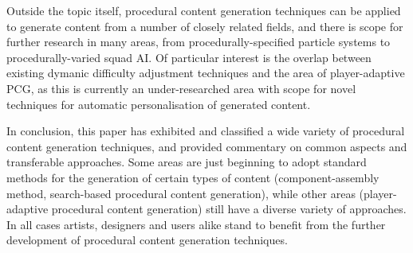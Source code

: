 \documentclass{acm_proc_article-sp}
\begin{document}
Outside the topic itself, procedural content generation techniques can be applied to generate content from a number of closely related fields, and there is scope for further research in many areas, from procedurally-specified particle systems to procedurally-varied squad AI. Of particular interest is the overlap between existing dymanic difficulty adjustment techniques and the area of player-adaptive PCG, as this is currently an under-researched area with scope for novel techniques for automatic personalisation of generated content.

In conclusion, this paper has exhibited and classified a wide variety of procedural content generation techniques, and provided commentary on common aspects and transferable approaches. Some areas are just beginning to adopt standard methods for the generation of certain types of content (component-assembly method, search-based procedural content generation), while other areas (player-adaptive procedural content generation) still have a diverse variety of approaches. In all cases artists, designers and users alike stand to benefit from the further development of procedural content generation techniques.



\newpage


\balancecolumns
\end{document}
